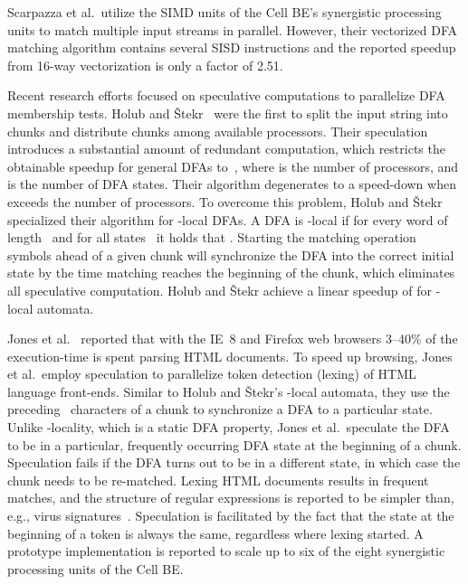 \documentclass[10pt, conference, compsocconf]{IEEEtran}
\begin{document}
Scarpazza et al.\ utilize the SIMD units of the Cell BE's synergistic
processing units to match multiple input streams in parallel. However,
their vectorized DFA matching
algorithm contains several SISD instructions and the reported speedup
from 16-way vectorization is only a factor of 2.51.


Recent research efforts focused on speculative computations to
parallelize DFA membership tests.
Holub and \v{S}tekr~\cite{Holub:2009} were the first to split the input
string into chunks and distribute chunks among available processors. Their
speculation introduces a substantial amount of redundant computation, which
restricts the obtainable speedup for general DFAs
to~, where
 is
the number of processors, and  is the number of DFA
states.
Their algorithm degenerates to a speed-down when
 exceeds the number of processors.
To overcome this problem, Holub and \v{S}tekr specialized their
algorithm for
-local DFAs. A DFA is -local if for every word of length~ and
for all states~ it holds that
. Starting the matching operation  symbols
ahead of a given
chunk will synchronize the DFA into the correct initial state by
the time matching reaches the beginning of the chunk, which eliminates
all speculative computation. Holub and  \v{S}tekr achieve
a linear speedup of  for -local automata.

Jones et al.~\cite{Jones2009} reported that with the IE~8 and Firefox
web browsers
3--40\% of the execution-time is spent parsing HTML documents. To speed
up browsing, Jones et al.\
employ speculation to parallelize token detection (lexing) of HTML
language front-ends.
Similar to Holub and \v{S}tekr's -local automata, they use the
preceding~
characters of a chunk to synchronize a DFA to a particular state.
Unlike -locality,
which is a static DFA property, Jones et al.\
speculate the DFA to be in a particular, frequently occurring DFA state
at the beginning of a chunk. Speculation fails if the DFA turns
out to be in a different state, in which case the chunk
needs to be re-matched. Lexing HTML documents results in frequent
matches, and the structure of regular expressions is reported to be
simpler than, e.g., virus signatures~\cite{Luchaup2011}. Speculation is
facilitated by the fact that the state at the beginning
of a token is always the same, regardless where lexing started. A
prototype implementation is reported to scale up to six of the eight
synergistic processing units of the Cell BE.
\end{document}
